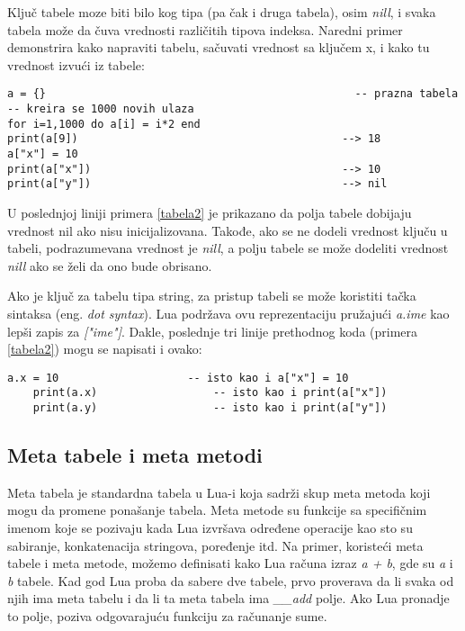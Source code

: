 \documentclass[a4paper]{article}
\begin{document}
Ključ tabele moze biti bilo kog tipa (pa čak i druga tabela), osim \textit{nill}, i svaka tabela može da čuva vrednosti različitih tipova indeksa. Naredni primer demonstrira kako napraviti tabelu, sačuvati vrednost sa ključem x, i kako tu vrednost izvući iz tabele:
\begin{lstlisting}[caption={Kreiranje tabele, dodeljivanje i vraćanje vrednosti \cite{bookProgInLua}},frame=single, label=tabela2]
a = {}										          -- prazna tabela
-- kreira se 1000 novih ulaza
for i=1,1000 do a[i] = i*2 end
print(a[9])    										--> 18
a["x"] = 10
print(a["x"])  										--> 10
print(a["y"])  										--> nil
\end{lstlisting}
U poslednjoj liniji primera \ref{tabela2} je prikazano da polja tabele dobijaju vrednost nil ako nisu inicijalizovana. Takođe, ako se ne dodeli vrednost ključu u tabeli, podrazumevana vrednost je \textit{nill}, a polju tabele se može dodeliti vrednost \textit{nill} ako se želi da ono bude obrisano.

Ako je ključ za tabelu tipa string, za pristup tabeli se može koristiti tačka sintaksa (eng. \textit{dot syntax}). Lua podržava ovu reprezentaciju pružajući \textit{a.ime} kao lepši zapis za \textit{["ime"]}. Dakle, poslednje tri linije prethodnog koda (primera \ref{tabela2}) mogu se napisati i ovako:
\begin{lstlisting}[caption={Primer čuvanja vrednosti u tabeli \cite{bookProgInLua}},frame=single, label=tabela3]
    a.x = 10                    -- isto kao i a["x"] = 10
    print(a.x)                  -- isto kao i print(a["x"])
    print(a.y)                  -- isto kao i print(a["y"])
\end{lstlisting}


\subsection*{Meta tabele i meta metodi}
Meta tabela je standardna tabela u Lua-i koja sadrži skup meta metoda koji mogu da promene ponašanje tabela. Meta metode su funkcije sa specifičnim imenom koje se pozivaju kada Lua izvršava određene operacije kao sto su sabiranje, konkatenacija stringova, poređenje itd. Na primer, koristeći meta tabele i meta metode, možemo definisati kako Lua računa izraz \textit{a + b}, gde su \textit{a} i \textit{b} tabele. Kad god Lua proba da sabere dve tabele, prvo proverava da li svaka od njih ima meta tabelu i da li ta meta tabela ima \textit{\_\_add} polje. Ako Lua pronadje to polje, poziva odgovarajuću funkciju za računanje sume.
\end{document}
